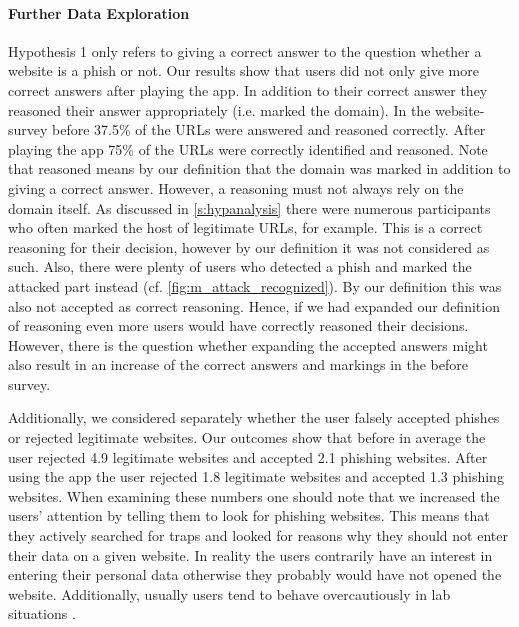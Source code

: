 \paragraph{Further Data Exploration}
\begin{description}[leftmargin=0cm]
	\item[Correct and Reasoned Answers:] Hypothesis 1 only refers to giving a correct answer to the question whether a website is a phish or not.
	Our results show that users did not only give more correct answers after playing the app.
	In addition to their correct answer they reasoned their answer appropriately (i.e. marked the domain).
	In the website-survey before 37.5\% of the URLs were answered and reasoned correctly.
	After playing the app 75\% of the URLs were correctly identified and reasoned. 
	Note that reasoned means by our definition that the domain was marked in addition to giving a correct answer.
	However, a reasoning must not always rely on the domain itself. 
	As discussed in \autoref{s:hypanalysis} there were numerous participants who often marked the host of legitimate URLs, for example.
	This is a correct reasoning for their decision, however by our definition it was not considered as such.
	Also, there were plenty of users who detected a phish and marked the attacked part instead (cf. \autoref{fig:m_attack_recognized}).
	By our definition this was also not accepted as correct reasoning.
	Hence, if we had expanded our definition of reasoning even more users would have correctly reasoned their decisions.
	However, there is the question whether expanding the accepted answers might also result in an increase of the correct answers and markings in the before survey.
	\item[False Negatives and Positives:] Additionally, we considered separately whether the user falsely accepted phishes or rejected legitimate websites. Our outcomes show that before in average the user rejected 4.9 legitimate websites and accepted 2.1 phishing websites.
	After using the app the user rejected 1.8 legitimate websites and accepted 1.3 phishing websites.
	When examining these numbers one should note that we increased the users' attention by telling them to look for phishing websites.
	This means that they actively searched for traps and looked for reasons why they should not enter their data on a given website.
	In reality the users contrarily have an interest in entering their personal data otherwise they probably would have not opened the website.
	Additionally, usually users tend to behave overcautiously in lab situations \cite{wu2006security, egelman2007security}.

\end{description}
